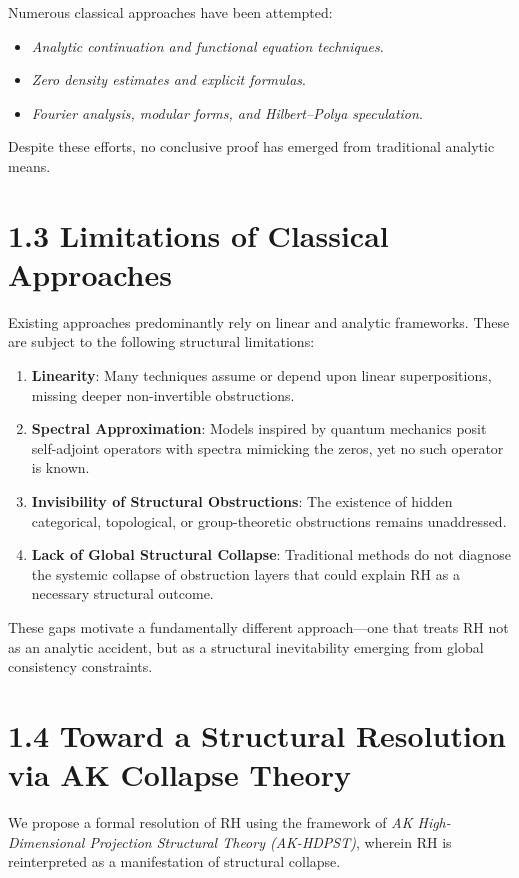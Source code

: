 \documentclass[11pt]{article}
\begin{document}
Numerous classical approaches have been attempted:

\begin{itemize}
  \item \emph{Analytic continuation and functional equation techniques}.
  \item \emph{Zero density estimates and explicit formulas}.
  \item \emph{Fourier analysis, modular forms, and Hilbert–Polya speculation}.
\end{itemize}

Despite these efforts, no conclusive proof has emerged from traditional analytic means.

\section*{1.3 Limitations of Classical Approaches}

Existing approaches predominantly rely on linear and analytic frameworks. These are subject to the following structural limitations:

\begin{enumerate}
  \item \textbf{Linearity}: Many techniques assume or depend upon linear superpositions, missing deeper non-invertible obstructions.
  \item \textbf{Spectral Approximation}: Models inspired by quantum mechanics posit self-adjoint operators with spectra mimicking the zeros, yet no such operator is known.
  \item \textbf{Invisibility of Structural Obstructions}: The existence of hidden categorical, topological, or group-theoretic obstructions remains unaddressed.
  \item \textbf{Lack of Global Structural Collapse}: Traditional methods do not diagnose the systemic collapse of obstruction layers that could explain RH as a necessary structural outcome.
\end{enumerate}

These gaps motivate a fundamentally different approach—one that treats RH not as an analytic accident, but as a structural inevitability emerging from global consistency constraints.

\section*{1.4 Toward a Structural Resolution via AK Collapse Theory}

We propose a formal resolution of RH using the framework of \emph{AK High-Dimensional Projection Structural Theory (AK-HDPST)}, wherein RH is reinterpreted as a manifestation of structural collapse.
\end{document}

